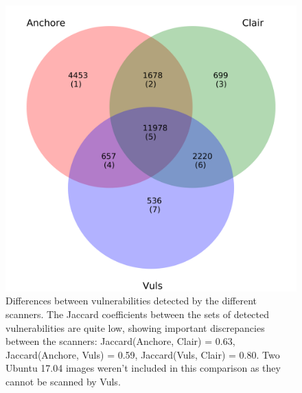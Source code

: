 \documentclass[a4paper,num-refs]{oup-contemporary}
\begin{document}
	\begin{figure}
        \includegraphics[width=\columnwidth]{Figures/venn.pdf}
	\caption{\label{fig:venn} Differences between vulnerabilities detected
	by the different scanners. The Jaccard coefficients between the sets of
	detected vulnerabilities are quite low, showing important discrepancies
	between the scanners: Jaccard(Anchore, Clair) = 0.63, Jaccard(Anchore, Vuls) =
	0.59, Jaccard(Vuls, Clair) = 0.80. Two Ubuntu 17.04 images weren't
	included in this comparison as they cannot be scanned by Vuls.}
\end{figure}
\end{document}
